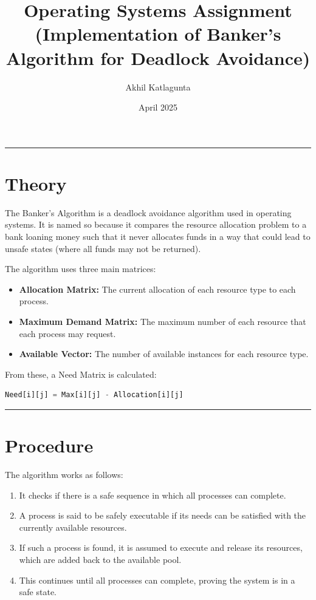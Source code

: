 \documentclass{article}
\title{\textbf{Operating Systems Assignment}\\
(Implementation of \textbf{Banker's Algorithm} for Deadlock Avoidance)
}
\author{Akhil Katlagunta}
\date{April 2025}
\begin{document}
\maketitle

\noindent\rule{\textwidth}{0.4pt}

\section*{Theory}
The Banker's Algorithm is a deadlock avoidance algorithm used in operating systems. It is named so because it compares the resource allocation problem to a bank loaning money such that it never allocates funds in a way that could lead to unsafe states (where all funds may not be returned).

\vspace{1em}
The algorithm uses three main matrices:

\begin{itemize}
    \item \textbf{Allocation Matrix:} The current allocation of each resource type to each process.
    \item \textbf{Maximum Demand Matrix:} The maximum number of each resource that each process may request.
    \item \textbf{Available Vector:} The number of available instances for each resource type.
\end{itemize}

\noindent From these, a Need Matrix is calculated:

\begin{lstlisting}[language=Python]
Need[i][j] = Max[i][j] - Allocation[i][j]
\end{lstlisting}

\noindent\rule{\textwidth}{0.4pt}

\section*{Procedure}
The algorithm works as follows:

\begin{enumerate}
    \item It checks if there is a safe sequence in which all processes can complete.
    \item A process is said to be safely executable if its needs can be satisfied with the currently available resources.
    \item If such a process is found, it is assumed to execute and release its resources, which are added back to the available pool.
    \item This continues until all processes can complete, proving the system is in a safe state.
\end{enumerate}
\end{document}
